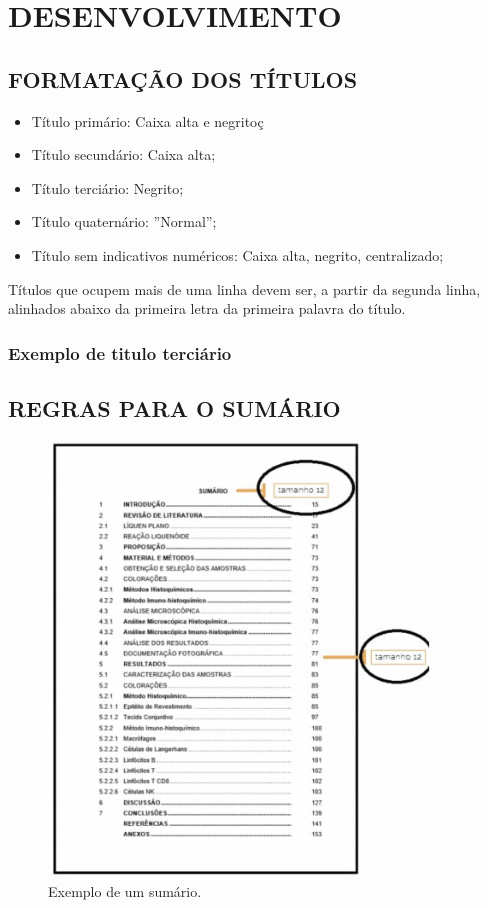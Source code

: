 \section{DESENVOLVIMENTO}

\subsection{FORMATAÇÃO DOS TÍTULOS}

\begin{itemize} 
    \item Título primário: Caixa alta e negritoç
    \item Título secundário: Caixa alta;
    \item Título terciário: Negrito;
    \item Título quaternário: ''Normal'';
    \item Título sem indicativos numéricos: Caixa alta, negrito, centralizado;
\end{itemize}

Títulos que ocupem mais de uma linha devem ser, a partir da segunda linha, alinhados abaixo da primeira letra da primeira palavra do título.

\subsubsection{Exemplo de titulo terciário}

\lipsum[2]

\subsection{REGRAS PARA O SUMÁRIO}

\begin{figure}[h]
    \centering
    \includegraphics[width=0.9\textwidth]{Figuras/exemplo_sumario.png} %
    \caption{Exemplo de um sumário.}
    \label{fig:exemplo_sumario}
\end{figure}


